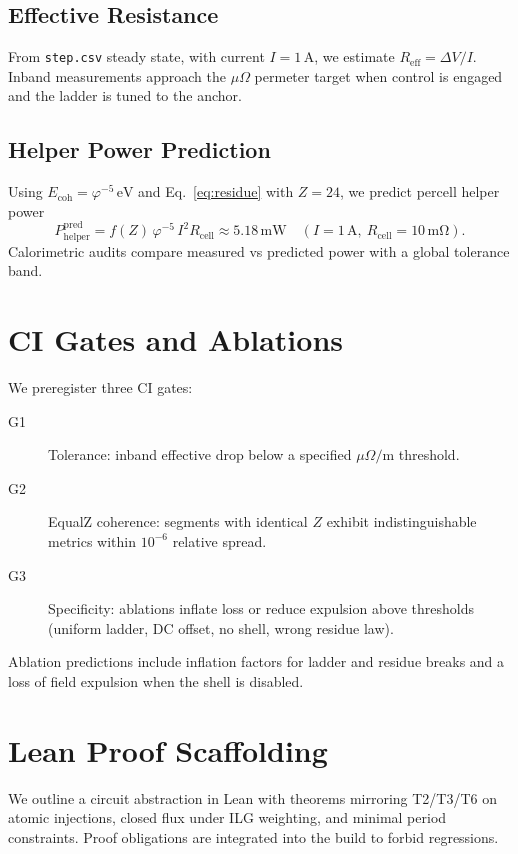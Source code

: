 \documentclass[11pt,a4paper]{article}
\newcommand{\Ecoh}{E_{\mathrm{coh}}}
\begin{document}
\subsection{Effective Resistance}
From \texttt{step.csv} steady state, with current \(I=1\,\mathrm{A}\), we estimate \(R_{\mathrm{eff}}=\Delta V/I\). In\textendash band measurements approach the \(\mu\Omega\) per\textendash meter target when control is engaged and the ladder is tuned to the anchor.

\subsection{Helper Power Prediction}
Using \(\Ecoh=\varphi^{-5}\,\mathrm{eV}\) and Eq.~\eqref{eq:residue} with \(Z=24\), we predict per\textendash cell helper power
\begin{equation}
  P^{\mathrm{pred}}_{\mathrm{helper}} = f(Z)\,\varphi^{-5}\,I^2 R_{\mathrm{cell}} \approx 5.18\,\mathrm{mW}\quad (I=1\,\mathrm{A},\ R_{\mathrm{cell}}=10\,\mathrm{m\Omega}).\label{eq:helper}
\end{equation}
Calorimetric audits compare measured vs predicted power with a global tolerance band.

\section{CI Gates and Ablations}
\label{sec:ci}
We pre\textendash register three CI gates:
\begin{description}
  \item[G1] Tolerance: in\textendash band effective drop below a specified \(\mu\Omega/\mathrm{m}\) threshold.
  \item[G2] Equal\textendash Z coherence: segments with identical \(Z\) exhibit indistinguishable metrics within \(10^{-6}\) relative spread.
  \item[G3] Specificity: ablations inflate loss or reduce expulsion above thresholds (uniform ladder, DC offset, no shell, wrong residue law).
\end{description}
Ablation predictions include inflation factors for ladder and residue breaks and a loss of field expulsion when the shell is disabled.

\section{Lean Proof Scaffolding}
\label{sec:lean}
We outline a circuit abstraction in Lean with theorems mirroring T2/T3/T6 on atomic injections, closed flux under ILG weighting, and minimal period constraints. Proof obligations are integrated into the build to forbid regressions.
\end{document}
